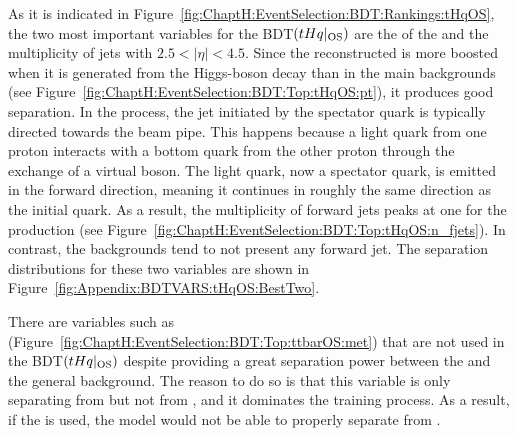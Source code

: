 \FloatBarrier

As it is indicated in Figure~\ref{fig:ChaptH:EventSelection:BDT:Rankings:tHqOS},
the two most important variables for the BDT$(tHq|_{\text{OS}})$ are the \pT of the \tauhad
and the multiplicity of jets with $2.5<|\eta|<4.5$. 
Since the reconstructed \tauhad is more boosted when it is generated from the Higgs-boson decay than in the main backgrounds %
(see Figure~\ref{fig:ChaptH:EventSelection:BDT:Top:tHqOS:pt}), it produces good separation.
In the \tHq process, the jet initiated by the spectator quark is typically directed towards the beam pipe. 
This happens because a light quark from one proton interacts with a bottom quark from the other proton 
through the exchange of a virtual \PW boson. The light quark, now a spectator quark, is emitted in the 
forward direction, meaning it continues in roughly the same direction as the initial quark. As a result,
the multiplicity of forward jets peaks at one for the \tHq production (see Figure~\ref{fig:ChaptH:EventSelection:BDT:Top:tHqOS:n_fjets}). 
In contrast, the backgrounds tend to not present any forward jet.
The separation distributions for these two variables are shown in Figure~\ref{fig:Appendix:BDTVARS:tHqOS:BestTwo}.

There are variables such as \MET (Figure~\ref{fig:ChaptH:EventSelection:BDT:Top:ttbarOS:met})
that are not used in the BDT$(tHq|_{\text{OS}})$ despite providing a great separation power between the \tHq and the general background.
The reason to do so is that this variable is only separating \tHq from \Zjets but not from \ttbar, and it dominates the training process.
As a result, if the \MET is used, the model would not be able to properly separate  \ttbar from \tHq.



